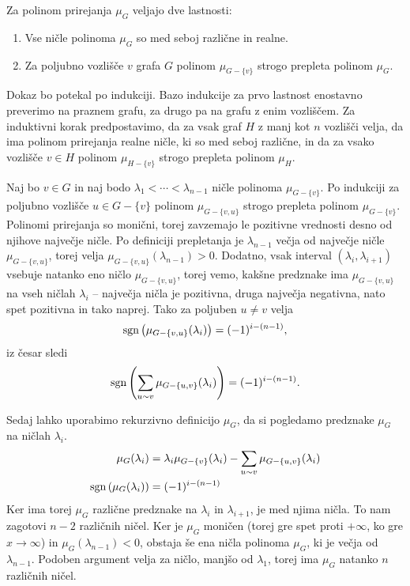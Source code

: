 \begin{izrek}
    Za polinom prirejanja \(\mu_G\) veljajo dve lastnosti:
    \begin{enumerate}
        \item Vse ničle polinoma \(\mu_G\) so med seboj različne in realne.
        \item Za poljubno vozlišče \(v\) grafa \(G\) polinom \(\mu_{G-\{v\}}\) strogo prepleta polinom \(\mu_G\).
    \end{enumerate}
\end{izrek}
\begin{dokaz}
    Dokaz bo potekal po indukciji. Bazo indukcije za prvo lastnost enostavno preverimo na praznem grafu, za drugo pa na grafu z enim vozliščem. Za induktivni korak predpostavimo, da za vsak graf \(H\) z manj kot \(n\) vozlišči velja, da ima polinom prirejanja realne ničle, ki so med seboj različne, in da za vsako vozlišče \(v\in H\) polinom \(\mu_{H-\{v\}}\) strogo prepleta polinom \(\mu_H\).

    Naj bo \(v\in G\) in naj bodo \(\lambda_1 < \cdots < \lambda_{n-1}\) ničle polinoma \(\mu_{G-\{v\}}\). Po indukciji za poljubno vozlišče \(u\in G-\{v\}\) polinom \(\mu_{G-\{v, u\}}\) strogo prepleta polinom \(\mu_{G-\{v\}}\). Polinomi prirejanja so monični, torej zavzemajo le pozitivne vrednosti desno od njihove največje ničle. Po definiciji prepletanja je \(\lambda_{n-1}\) večja od največje ničle \(\mu_{G-\{v, u\}}\), torej velja \(\mu_{G-\{v, u\}}(\lambda_{n-1}) > 0\). Dodatno, vsak interval \((\lambda_i, \lambda_{i+1})\) vsebuje natanko eno ničlo \(\mu_{G-\{v, u\}}\), torej vemo, kakšne predznake ima \(\mu_{G-\{v, u\}}\) na vseh ničlah \(\lambda_i\) -- največja ničla je pozitivna, druga največja negativna, nato spet pozitivna in tako naprej. Tako za poljuben \(u\neq v\) velja
    \begin{align*}
        \operatorname{sgn}\left({\mu_{G-\{v, u\}}(\lambda_i)}\right) = (-1)^{i-(n-1)},
    \end{align*}
    iz česar sledi
    \begin{align*}
        \operatorname{sgn}\left({\sum_{u\sim v} \mu_{G-\{u, v\}}(\lambda_i)}\right) = (-1)^{i - (n-1)}.
    \end{align*}

    Sedaj lahko uporabimo rekurzivno definicijo \(\mu_G\), da si pogledamo predznake \(\mu_G\) na ničlah \(\lambda_i\).
    \begin{align*}
        \mu_G(\lambda_i) &= \lambda_i \mu_{G-\{v\}}(\lambda_i) - \sum_{u\sim v} \mu_{G-\{u, v\}}(\lambda_i) \\
        \operatorname{sgn}\left({\mu_G(\lambda_i)}\right) &= (-1)^{i-(n-1)}
    \end{align*}
    Ker ima torej \(\mu_G\) različne predznake na \(\lambda_i\) in \(\lambda_{i+1}\), je med njima ničla. To nam zagotovi \(n-2\) različnih ničel. Ker je \(\mu_G\) moničen (torej gre spet proti \(+\infty\), ko gre \(x\to \infty\)) in \(\mu_G(\lambda_{n-1}) < 0\), obstaja še ena ničla polinoma \(\mu_G\), ki je večja od \(\lambda_{n-1}\). Podoben argument velja za ničlo, manjšo od \(\lambda_1\), torej ima \(\mu_G\) natanko \(n\) različnih ničel.
\end{dokaz}

